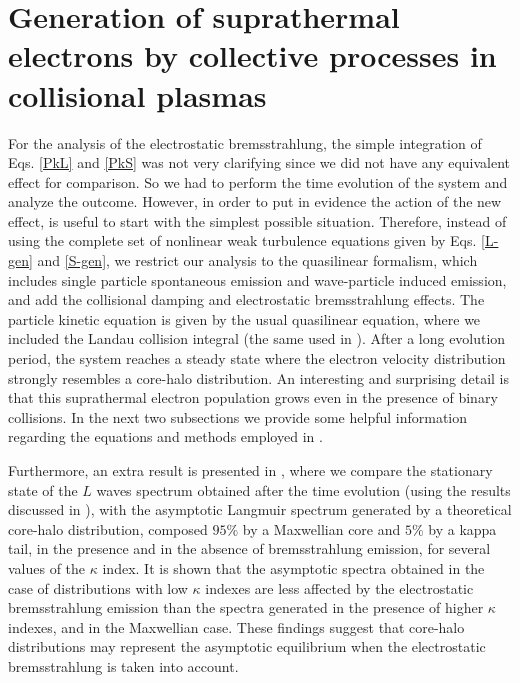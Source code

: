\documentclass[12pt,a4paper,ruledheader]{report}
\begin{document}
\section{Generation of suprathermal electrons by collective processes
  in collisional plasmas}
\label{sec:gen-supr}
For the analysis of the electrostatic bremsstrahlung, the simple integration
of Eqs. \eqref{PkL} and \eqref{PkS}
was not very clarifying since we did not have any equivalent effect for
comparison. So we had to perform the time evolution of the system and analyze
the outcome. However, in order to put in evidence the action of the new effect,
is useful to start with the simplest possible situation. Therefore, instead of
using the complete set of nonlinear weak turbulence equations given by
Eqs. \eqref{L-gen} and \eqref{S-gen}, we restrict our analysis to the
quasilinear formalism, which includes single particle spontaneous emission
and wave-particle induced emission, and add the collisional damping and
electrostatic bremsstrahlung effects. The particle kinetic equation is
given by the usual quasilinear equation, where we included the Landau
collision integral (the same used in \cite{Tigik2016a}). After a long
evolution period, the system reaches a steady state where the electron
velocity distribution strongly resembles a core-halo distribution. An
interesting and surprising detail is that this suprathermal electron
population grows even in the presence of binary collisions. In the next
two subsections we provide some helpful information regarding the equations
and methods employed in \cite{Tigik2017a}.

Furthermore, an extra result is presented in , where
we compare the stationary state of the $L$ waves spectrum obtained
after the time evolution (using the results discussed in \cite{
  Tigik2016a}), with the asymptotic Langmuir spectrum generated by
a theoretical core-halo distribution, composed $95\%$ by a Maxwellian
core and $5\%$ by a kappa tail, in the presence and in the absence of
bremsstrahlung emission, for several values of the $\kappa$ index. It is
shown that the asymptotic spectra obtained in the case of distributions
with low $\kappa$ indexes are less affected by the electrostatic
bremsstrahlung emission than the spectra generated in the presence of
higher $\kappa$ indexes, and in the Maxwellian case. These findings
suggest that core-halo distributions may represent the asymptotic
equilibrium when the electrostatic bremsstrahlung is taken into account.
\end{document}
